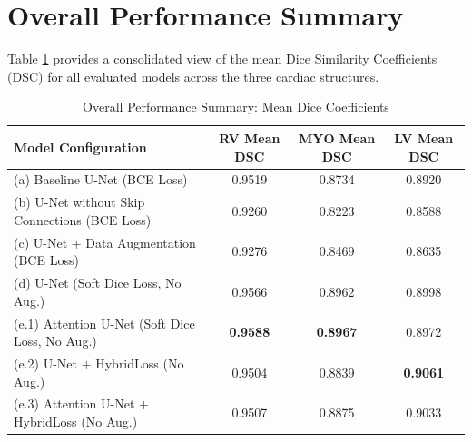 \documentclass{article}
\begin{document}
\section{Overall Performance Summary}
Table \ref{tab:overall_summary} provides a consolidated view of the mean Dice Similarity Coefficients (DSC) for all evaluated models across the three cardiac structures.

\begin{table}[H]
  \centering
  \caption{Overall Performance Summary: Mean Dice Coefficients}
  \label{tab:overall_summary}
  \begin{tabular}{lccc}
    \toprule
    Model Configuration                             & RV Mean DSC     & MYO Mean DSC    & LV Mean DSC     \\
    \midrule
    (a) Baseline U-Net (BCE Loss)                   & 0.9519          & 0.8734          & 0.8920          \\
    (b) U-Net without Skip Connections (BCE Loss)   & 0.9260          & 0.8223          & 0.8588          \\
    (c) U-Net + Data Augmentation (BCE Loss)        & 0.9276          & 0.8469          & 0.8635          \\
    (d) U-Net (Soft Dice Loss, No Aug.)             & 0.9566          & 0.8962          & 0.8998          \\
    (e.1) Attention U-Net (Soft Dice Loss, No Aug.) & \textbf{0.9588} & \textbf{0.8967} & 0.8972          \\
    (e.2) U-Net + HybridLoss (No Aug.)              & 0.9504          & 0.8839          & \textbf{0.9061} \\
    (e.3) Attention U-Net + HybridLoss (No Aug.)    & 0.9507          & 0.8875          & 0.9033          \\
    \bottomrule
  \end{tabular}
\end{table}
\end{document}
